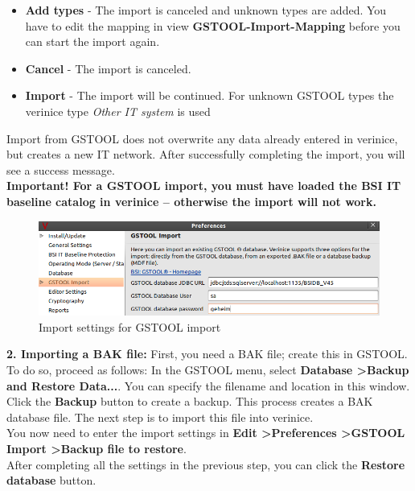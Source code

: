 \documentclass[a4paper,10pt]{book}
\begin{document}
\begin{itemize}
 \item \textbf{Add types} - The import is canceled and unknown types are added. You have to edit the mapping in view \textbf{GSTOOL-Import-Mapping} before you can start the import again.
 \item \textbf{Cancel} - The import is canceled.
 \item \textbf{Import} - The import will be continued. For unknown GSTOOL types the verinice type \textit{Other IT system} is used
\end{itemize}
Import from GSTOOL does not overwrite any data already entered in verinice, but creates a new IT network. After
successfully completing the import, you will see a success message.
\newline\\
\textbf{Important! For a GSTOOL import, you
must have loaded the BSI IT baseline catalog in verinice – otherwise the import will not work.}
\newline\\
\begin{figure}[htb!]
  \centering
  \includegraphics[scale=.43]{Screenshot/Gstool_import_portsettings-en.png}
  \caption{\label{Import settings for GSTOOL import} Import settings for GSTOOL import}
\end{figure}
\newline
\textbf{2. Importing a BAK file:} First, you need a BAK file; create this in GSTOOL. To do so, proceed as follows:
In the GSTOOL menu, select \textbf{Database \textgreater Backup and Restore Data...}. You can specify the filename
and location in this window. Click the \textbf{Backup} button to create a backup. This process creates a BAK database
file. The next step is to import this file into verinice.
\newline\\
You now need to enter the import settings in \textbf{Edit \textgreater Preferences \textgreater \textsc{GSTOOL} Import
\textgreater Backup file to restore}.
\newline\\
After completing all the settings in the previous step, you can click the \textbf{Restore database} button.
\end{document}
